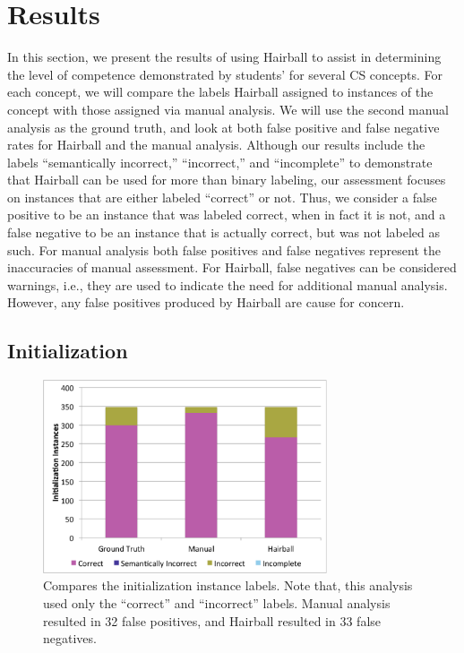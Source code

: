 \section{Results}

In this section, we present the results of using Hairball to assist in
determining the level of competence demonstrated by students'  for
several CS concepts. For each concept, we will compare the labels Hairball
assigned to instances of the concept with those assigned via manual
analysis. We will use the second manual analysis as the ground truth, and look
at both false positive and false negative rates for Hairball and the manual
analysis. Although our results include the labels ``semantically incorrect,''
``incorrect,'' and ``incomplete'' to demonstrate that Hairball can be used for
more than binary labeling, our assessment focuses on instances that are either
labeled ``correct'' or not. Thus, we consider a false positive to be an
instance that was labeled correct, when in fact it is not, and a false negative
to be an instance that is actually correct, but was not labeled as such. For
manual analysis both false positives and false negatives represent the
inaccuracies of manual assessment. For Hairball, false negatives can be
considered warnings, i.e., they are used to indicate the need for additional
manual analysis. However, any false positives produced by Hairball are cause
for concern.


\subsection{Initialization}
\begin{figure}[!t]
\centering \includegraphics[trim=.3in .15in .3in .15in, clip,
  width=3.3in]{graphs/AutoInit.eps}
\caption{Compares the initialization instance labels. Note that, this analysis
  used only the ``correct'' and ``incorrect'' labels. Manual analysis resulted
  in 32 false positives, and Hairball resulted in 33 false negatives.}
\end{figure}


